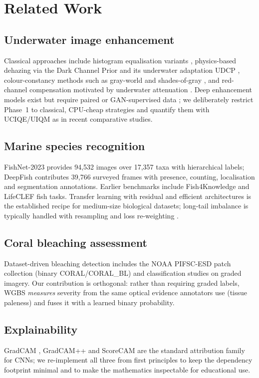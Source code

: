 \documentclass[conference]{IEEEtran}
\begin{document}
\section{Related Work}
\subsection{Underwater image enhancement}
Classical approaches include histogram equalisation variants \cite{zuiderveld1994clahe}, physics-based dehazing via the Dark Channel Prior \cite{he2010dcp} and its underwater adaptation UDCP \cite{drews2013udcp}, colour-constancy methods such as gray-world and shades-of-gray \cite{bianco2017wb}, and red-channel compensation motivated by underwater attenuation \cite{galdran2015red}. Deep enhancement models exist but require paired or GAN-supervised data \cite{li2017watergan}; we deliberately restrict Phase~1 to classical, CPU-cheap strategies and quantify them with UCIQE/UIQM as in recent comparative studies.

\subsection{Marine species recognition}
FishNet-2023 \cite{khan2023fishnet} provides 94{,}532 images over 17{,}357 taxa with hierarchical labels; DeepFish \cite{saleh2020deepfish} contributes 39{,}766 surveyed frames with presence, counting, localisation and segmentation annotations. Earlier benchmarks include Fish4Knowledge \cite{fish4knowledge} and LifeCLEF fish tasks. Transfer learning with residual \cite{he2016resnet} and efficient architectures \cite{tan2019efficientnet,howard2019mobilenet,liu2022convnext} is the established recipe for medium-size biological datasets; long-tail imbalance is typically handled with resampling and loss re-weighting \cite{huang2016ldam}.

\subsection{Coral bleaching assessment}
Dataset-driven bleaching detection includes the NOAA PIFSC-ESD patch collection \cite{noaa2024coral} (binary CORAL/CORAL\_BL) and classification studies on graded imagery. Our contribution is orthogonal: rather than requiring graded labels, WGBS \emph{measures} severity from the same optical evidence annotators use (tissue paleness) and fuses it with a learned binary probability.

\subsection{Explainability}
GradCAM \cite{selvaraju2017gradcam}, GradCAM++ \cite{chattopadhyay2018gradcampp} and ScoreCAM \cite{wang2020scorecam} are the standard attribution family for CNNs; we re-implement all three from first principles to keep the dependency footprint minimal and to make the mathematics inspectable for educational use.
\end{document}
